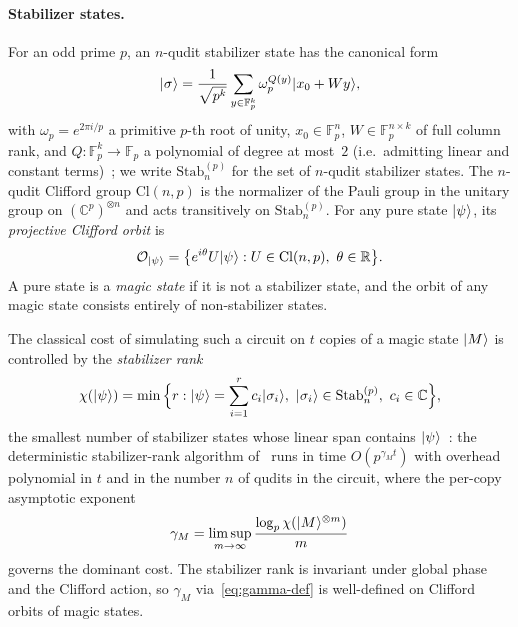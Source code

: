 \documentclass[11pt]{article}
\theoremstyle{definition}
\newcommand{\microspace}{\mspace{0.5mu}}
\newcommand{\ket}[1]{\lvert\microspace #1 \microspace \rangle}
\newcommand{\complex}{\mathbb{C}}
\newcommand{\real}{\mathbb{R}}
\newcommand{\F}{\mathcal{F}}
\renewcommand{\F}[1]{\mathbb{F}_{#1}}
\newcommand{\chiR}{\chi}
\newcommand{\Cl}{\mathrm{Cl}}
\begin{document}
	\paragraph{Stabilizer states.}
	For an odd prime $p$, an $n$-qudit stabilizer state has the
	canonical form
	\begin{equation}\label{eq:stab-canonical}
		\ket{\sigma} = \frac{1}{\sqrt{p^k}} \sum_{y \in \F{p}^k}
		\omega_p^{Q(y)} \ket{x_0 + W y},
	\end{equation}
	with $\omega_p = e^{2 \pi i / p}$ a primitive $p$-th root of
	unity, $x_0 \in \F{p}^n$, $W \in \F{p}^{n \times k}$ of full
	column rank, and $Q : \F{p}^k \to \F{p}$ a polynomial of degree
	at most~$2$ (i.e.\ admitting linear and constant
	terms)~\cite{gottesman1999fault, hostens2005stabilizer}; we
	write $\mathrm{Stab}_n^{(p)}$ for the set of $n$-qudit stabilizer
	states. The $n$-qudit Clifford group $\Cl(n, p)$ is the normalizer
	of the Pauli group in the unitary group on
	$(\complex^p)^{\otimes n}$ and acts transitively on
	$\mathrm{Stab}_n^{(p)}$. For any pure state $\ket{\psi}$, its
	\emph{projective Clifford orbit} is
	\begin{equation}\label{eq:clifford-orbit-def}
		\mathcal{O}_{\ket{\psi}} = \big\{ e^{i\theta} U \ket{\psi}
		: U \in \Cl(n, p),\ \theta \in \real \big\}.
	\end{equation}
	A pure state is a \emph{magic state} if it is not a stabilizer
	state, and the orbit of any magic state consists entirely of
	non-stabilizer states.

	The classical cost of simulating such a circuit on $t$ copies of
	a magic state $\ket M$ is controlled by the \emph{stabilizer rank}
	\begin{equation}\label{eq:chi-def}
		\chiR(\ket\psi) = \min\Big\{ r : \ket\psi = \sum_{i=1}^{r}
		c_i \ket{\sigma_i},\ \ket{\sigma_i} \in \mathrm{Stab}_n^{(p)},\
		c_i \in \complex \Big\},
	\end{equation}
	the smallest number of stabilizer states whose linear span
	contains $\ket\psi$~\cite{bravyi2016trading, bravyi2016improved,
		bravyi2019simulation}: the deterministic stabilizer-rank
	algorithm of~\cite{bravyi2016trading} runs in
	time $O(p^{\gamma_M t})$ with overhead polynomial in $t$ and in
	the number $n$ of qudits in the circuit, where the per-copy
	asymptotic exponent
	\begin{equation}\label{eq:gamma-def}
		\gamma_M = \limsup_{m \to \infty}
		\frac{\log_p \chiR\!\left(\ket{M}^{\otimes m}\right)}{m}
	\end{equation}
	governs the dominant cost. The stabilizer rank is invariant under
	global phase and the Clifford action, so $\gamma_M$
	via~\eqref{eq:gamma-def} is well-defined on Clifford orbits of
	magic states.
\end{document}

